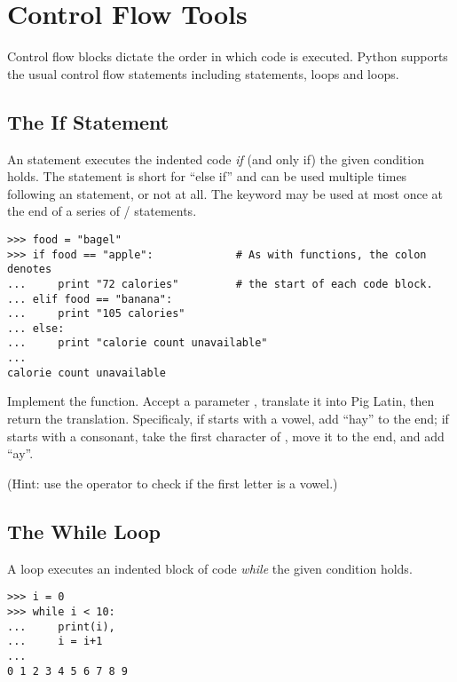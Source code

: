 
\section*{Control Flow Tools}
Control flow blocks dictate the order in which code is executed.
Python supports the usual control flow statements including  statements,  loops and  loops.

\subsection*{The If Statement}
An  statement executes the indented code \emph{if} (and only if) the given condition holds.
The  statement is short for ``else if'' and can be used multiple times following an  statement, or not at all. 
The  keyword may be used at most once at the end of a series of / statements.
\begin{lstlisting}
>>> food = "bagel"         
>>> if food == "apple":             # As with functions, the colon denotes
...     print "72 calories"         # the start of each code block.
... elif food == "banana":
...     print "105 calories"
... else: 
...     print "calorie count unavailable"
...     
calorie count unavailable
\end{lstlisting}

\begin{problem}
Implement the  function.
Accept a parameter , translate it into Pig Latin, then return the translation.
Specificaly, if  starts with a vowel, add ``hay'' to the end; if  starts with a consonant, take the first character of , move it to the end, and add ``ay''.

(Hint: use the  operator to check if the first letter is a vowel.)
\end{problem}

\subsection*{The While Loop}
A  loop executes an indented block of code \emph{while} the given condition holds. 

\begin{lstlisting}
>>> i = 0
>>> while i < 10:        
...     print(i),            
...     i = i+1
...     
0 1 2 3 4 5 6 7 8 9
\end{lstlisting}

